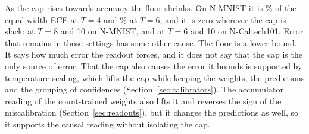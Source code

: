 \documentclass[10pt]{article}
\begin{document}
As the cap rises towards accuracy the floor shrinks. On N-MNIST it is \frNmFourW\% of the %
equal-width ECE at $T=4$ and \frNmSixW\% at $T=6$, and it is zero wherever the cap is slack: at %
$T=8$ and 10 on N-MNIST, and at $T=6$ and 10 on N-Caltech101. Error that remains in those settings has
some other cause. The floor is a lower bound. It says how much error the readout forces, and it
does not say that the cap is the only source of error. That the cap also causes the error it
bounds is supported by temperature scaling, which lifts the cap while keeping the weights, the
predictions and the grouping of confidences (Section~\ref{sec:calibrators}). The accumulator
reading of the count-trained weights also lifts it and reverses the sign of the miscalibration
(Section~\ref{sec:readouts}), but it changes the predictions as well, so it supports the causal
reading without isolating the cap.
\end{document}
